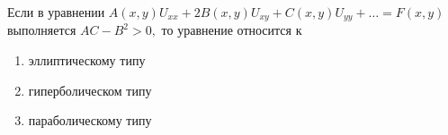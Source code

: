 Если в уравнении \(A\left(x,y\right)U_{xx}+2B\left(x,y\right)U_{xy}+C\left(x,y\right)U_{yy}+\dots =F\left(x,y\right)\) выполняется \(AC-B^2>0,\) то уравнение относится к

\begin{enumerate}[label=\arabic*)]
    \item эллиптическому типу
    \item гиперболическом типу
    \item параболическому типу
\end{enumerate}

